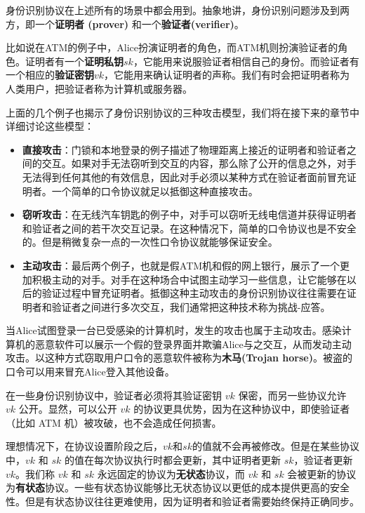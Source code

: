 \begin{snote}
身份识别协议在上述所有的场景中都会用到。抽象地讲，身份识别问题涉及到两方，即一个\textbf{证明者 (prover)} 和一个\textbf{验证者(verifier)}。

比如说在ATM的例子中，Alice扮演证明者的角色，而ATM机则扮演验证者的角色。证明者有一个\textbf{证明私钥}$sk$，它能用来说服验证者相信自己的身份。而验证者有一个相应的\textbf{验证密钥}$vk$，它能用来确认证明者的声称。我们有时会把证明者称为人类用户，把验证者称为计算机或服务器。

上面的几个例子也揭示了身份识别协议的三种攻击模型，我们将在接下来的章节中详细讨论这些模型：

\begin{itemize}
    \item \textbf{直接攻击}：门锁和本地登录的例子描述了物理距离上接近的证明者和验证者之间的交互。如果对手无法窃听到交互的内容，那么除了公开的信息之外，对手无法得到任何其他的有效信息，因此对手必须以某种方式在验证者面前冒充证明者。一个简单的口令协议就足以抵御这种直接攻击。
    \item \textbf{窃听攻击}：在无线汽车钥匙的例子中，对手可以窃听无线电信道并获得证明者和验证者之间的若干次交互记录。在这种情况下，简单的口令协议也是不安全的。但是稍微复杂一点的一次性口令协议就能够保证安全。
    \item \textbf{主动攻击}：最后两个例子，也就是假ATM机和假的网上银行，展示了一个更加积极主动的对手。对手在这种场合中试图主动学习一些信息，让它能够在以后的验证过程中冒充证明者。抵御这种主动攻击的身份识别协议往往需要在证明者和验证者之间进行多次交互，我们通常把这种技术称为挑战-应答。
\end{itemize}

当Alice试图登录一台已受感染的计算机时，发生的攻击也属于主动攻击。感染计算机的恶意软件可以展示一个假的登录界面并欺骗Alice与之交互，从而发动主动攻击。以这种方式窃取用户口令的恶意软件被称为\textbf{木马(Trojan horse)}。被盗的口令可以用来冒充Alice登入其他设备。	
\end{snote}

\begin{snote}[验证密钥的保密与公开。]
在一些身份识别协议中，验证者必须将其验证密钥 $vk$ 保密，而另一些协议允许 $vk$ 公开。显然，可以公开 $vk$ 的协议更具优势，因为在这种协议中，即使验证者（比如 ATM 机）被攻破，也不会造成任何损害。
\end{snote}

\begin{snote}[无状态协议与有状态协议。]
理想情况下，在协议设置阶段之后，$vk$和$sk$的值就不会再被修改。但是在某些协议中，$vk$ 和 $sk$ 的值在每次协议执行时都会更新，其中证明者更新 $sk$，验证者更新 $vk$。我们称 $vk$ 和 $sk$ 永远固定的协议为\textbf{无状态}协议，而 $vk$ 和 $sk$ 会被更新的协议为\textbf{有状态}协议。一些有状态协议能够比无状态协议以更低的成本提供更高的安全性。但是有状态协议往往更难使用，因为证明者和验证者需要始终保持正确同步。
\end{snote}

